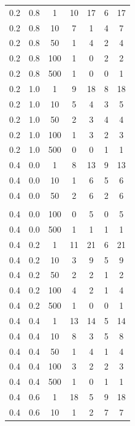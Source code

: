 \begin{longtable}{|c|c|c|c|c|c|c|}
	0.2 &  0.8 &    1 &    10 &    17 &     6 &    17 \\
	0.2 &  0.8 &   10 &     7 &     1 &     4 &     7 \\
	0.2 &  0.8 &   50 &     1 &     4 &     2 &     4 \\
	0.2 &  0.8 &  100 &     1 &     0 &     2 &     2 \\
	0.2 &  0.8 &  500 &     1 &     0 &     0 &     1 \\ \hline
	0.2 &  1.0 &    1 &     9 &    18 &     8 &    18 \\
	0.2 &  1.0 &   10 &     5 &     4 &     3 &     5 \\
	0.2 &  1.0 &   50 &     2 &     3 &     4 &     4 \\
	0.2 &  1.0 &  100 &     1 &     3 &     2 &     3 \\
	0.2 &  1.0 &  500 &     0 &     0 &     1 &     1 \\ \hline
	0.4 &  0.0 &    1 &     8 &    13 &     9 &    13 \\
	0.4 &  0.0 &   10 &     1 &     6 &     5 &     6 \\
	0.4 &  0.0 &   50 &     2 &     6 &     2 &     6 \\
	\hline
	\pagebreak
	\multicolumn{7}{l}{\textit{Продолжение таблицы}}\\
	\hline
	0.4 &  0.0 &  100 &     0 &     5 &     0 &     5 \\
	0.4 &  0.0 &  500 &     1 &     1 &     1 &     1 \\ \hline
	0.4 &  0.2 &    1 &    11 &    21 &     6 &    21 \\
	0.4 &  0.2 &   10 &     3 &     9 &     5 &     9 \\
	0.4 &  0.2 &   50 &     2 &     2 &     1 &     2 \\
	0.4 &  0.2 &  100 &     4 &     2 &     1 &     4 \\
	0.4 &  0.2 &  500 &     1 &     0 &     0 &     1 \\ \hline
	0.4 &  0.4 &    1 &    13 &    14 &     5 &    14 \\
	0.4 &  0.4 &   10 &     8 &     3 &     5 &     8 \\
	0.4 &  0.4 &   50 &     1 &     4 &     1 &     4 \\
	0.4 &  0.4 &  100 &     3 &     2 &     2 &     3 \\
	0.4 &  0.4 &  500 &     1 &     0 &     1 &     1 \\ \hline
	0.4 &  0.6 &    1 &    18 &     5 &     9 &    18 \\
	0.4 &  0.6 &   10 &     1 &     2 &     7 &     7 \\

\end{longtable}
